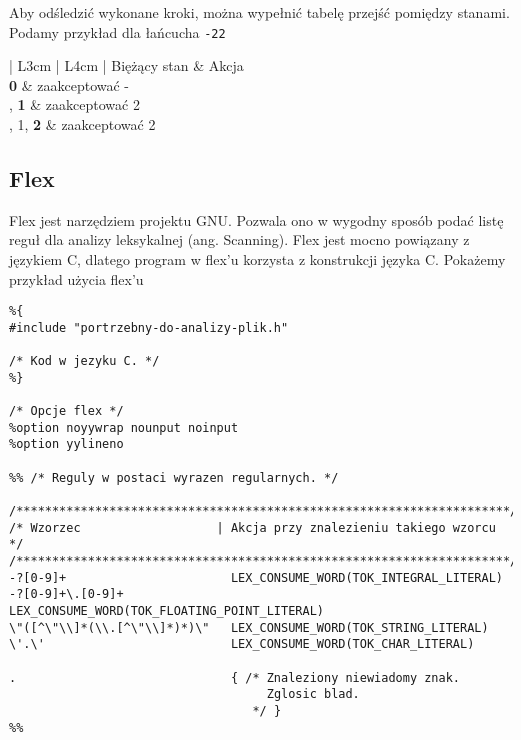 		Aby odśledzić wykonane kroki, można wypełnić tabelę przejść pomiędzy stanami. Podamy przykład dla
		łańcucha \texttt{-22}

		\spacing
		\spacing

	\begin{center}
		\setlength{\tabcolsep}{0.5em}
		\renewcommand{\arraystretch}{1.2}
		\begin{tabular}{ | L{3cm} | L{4cm} | }
			\hline
			Biężący stan        & Akcja \\
			\hline
			\textbf{0}          & zaakceptować - \\
			, \textbf{1}       & zaakceptować 2 \\
			, 1, \textbf{2}    & zaakceptować 2 \\
			\hline
		\end{tabular}
	\end{center}
	
	\newpage

\subsection{Flex}

	Flex jest narzędziem projektu GNU. Pozwala ono w wygodny sposób podać listę reguł dla analizy
	leksykalnej (ang. Scanning). Flex jest mocno powiązany z językiem C, dlatego program w flex'u
	korzysta z konstrukcji języka C. Pokażemy przykład użycia flex'u
	
	\spacing
	
\begin{lstlisting}
%{
#include "portrzebny-do-analizy-plik.h"

/* Kod w jezyku C. */
%}

/* Opcje flex */
%option noyywrap nounput noinput
%option yylineno

%% /* Reguly w postaci wyrazen regularnych. */

/*********************************************************************/
/* Wzorzec                   | Akcja przy znalezieniu takiego wzorcu */
/*********************************************************************/
-?[0-9]+                       LEX_CONSUME_WORD(TOK_INTEGRAL_LITERAL)
-?[0-9]+\.[0-9]+               LEX_CONSUME_WORD(TOK_FLOATING_POINT_LITERAL)
\"([^\"\\]*(\\.[^\"\\]*)*)\"   LEX_CONSUME_WORD(TOK_STRING_LITERAL)
\'.\'                          LEX_CONSUME_WORD(TOK_CHAR_LITERAL)

.                              { /* Znaleziony niewiadomy znak.
                                    Zglosic blad.
                                  */ }
%%
\end{lstlisting}

